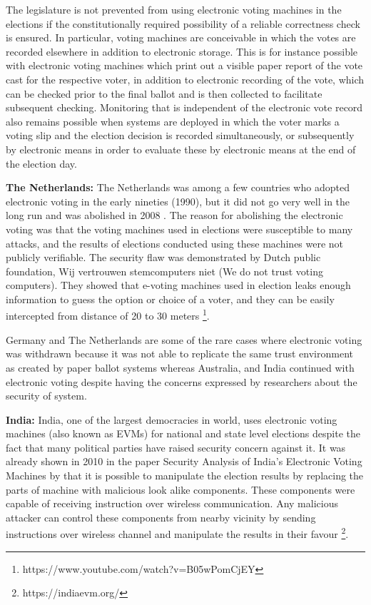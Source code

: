   \begin{displayquote}
  The legislature is not prevented from using electronic voting machines 
  in the elections if the constitutionally required possibility of a 
  reliable correctness check is ensured. In particular, voting machines 
  are conceivable in which the votes are recorded elsewhere in addition
   to electronic storage. This is for instance possible with electronic
   voting machines which print out a visible paper report of the vote 
   cast for the respective voter, in addition to electronic recording 
   of the vote, which can be checked prior to the final ballot and is
    then collected to facilitate subsequent checking. Monitoring that is
     independent of the electronic vote record also remains possible when
     systems are deployed in which the voter marks a voting slip and the 
     election decision is recorded simultaneously, 
     or subsequently by electronic means in 
     order to evaluate these by electronic means at the end of the 
     election day.
     \end{displayquote}
  
  \textbf{The Netherlands:}
  The Netherlands was among a few countries who adopted electronic voting 
  in the early nineties (1990), but it did not go very well in the long 
  run and was abolished in 2008 \citep{Jacobs2009}. 
  The reason for abolishing the electronic voting was that   
  the voting machines used in elections were susceptible to many attacks,
  and the results of elections conducted using these machines 
  were not publicly verifiable.  The security flaw was demonstrated by 
  Dutch public foundation, Wij vertrouwen stemcomputers niet
  (We do not trust voting computers). 
  They showed that e-voting machines used in election leaks enough
  information to guess the option or choice of a voter, 
  and they can be easily intercepted from distance of 20 to 30 meters
  \footnote{https://www.youtube.com/watch?v=B05wPomCjEY}. 
  
  
  Germany and The Netherlands are some of the rare cases where 
  electronic voting was withdrawn because it was not able to 
  replicate the same trust environment as created by paper 
  ballot systems whereas Australia, and India continued 
  with electronic voting despite having the concerns expressed 
  by researchers about the security of system. 
  
  \textbf{India:}
  India, one of the largest democracies in world, 
  uses electronic voting machines (also known as EVMs) for national 
  and state level  elections despite the fact that many political parties have raised security 
  concern against it. It was already shown in 2010 in the paper 
  Security Analysis of India's Electronic Voting Machines by 
  \cite{Wolchok:2010:SAI:1866307.1866309}  that it 
  is possible to manipulate the election results by replacing the 
  parts of machine with malicious look alike components. These components 
  were capable of receiving instruction over wireless communication. Any malicious 
  attacker can control these components from nearby vicinity by sending 
  instructions over wireless channel and 
  manipulate the results in their favour \footnote{https://indiaevm.org/}.
  

